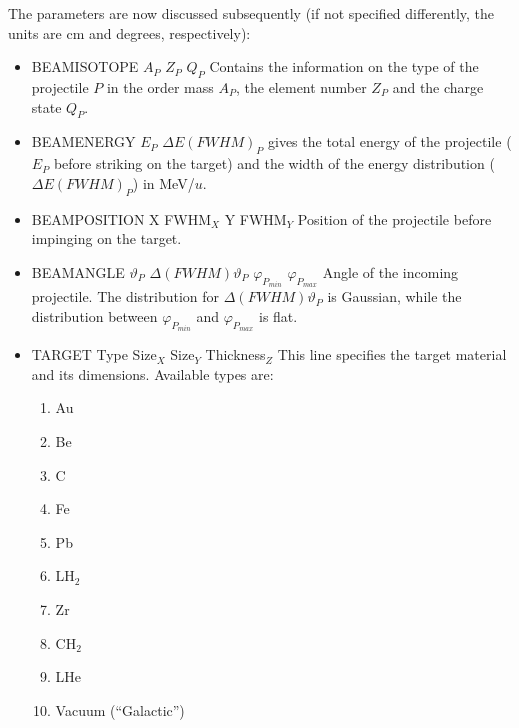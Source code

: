 \documentclass[12pt]{book}
\begin{document}
The parameters are now discussed subsequently (if not specified differently, 
the units are cm and degrees, respectively):\hfill{}
\begin{itemize}
\item BEAMISOTOPE $A_{P}$ $Z_{P}$ $Q_{P}$ \hfill{} \linebreak
  Contains the information on the type of the projectile $P$ in the order 
  mass $A_{P}$, the element number $Z_{P}$ and the charge state $Q_{P}$.
\item BEAMENERGY $E_{P}$ $\Delta E(FWHM)_{P}$\hfill{} \linebreak
  gives the total energy of the projectile 
  ( $E_{P}$ before striking on the target) 
  and the width of the energy distribution ($\Delta E(FWHM)_{P}$) in MeV/$u$.
\item BEAMPOSITION X FWHM$_{X}$ Y FWHM$_{Y}$\hfill{} \linebreak 
  Position of the projectile before impinging on the target. 
\item BEAMANGLE $\vartheta_{P}$ $\Delta (FWHM) \vartheta_{P}$ $\varphi_{P_{min}}$ $\varphi_{P_{max}}$
  \hfill{} \linebreak
  Angle of the incoming projectile. The distribution for $\Delta (FWHM) \vartheta_{P}$ is Gaussian, while the 
  distribution between $\varphi_{P_{min}}$ and $\varphi_{P_{max}}$ is flat.
\item TARGET Type Size$_{X}$ Size$_{Y}$ Thickness$_{Z}$\hfill{} \linebreak 
  This line specifies the target material and its dimensions. Available types are:
  \begin{enumerate}
  	\item Au
  	\item Be
  	\item C
  	\item Fe
  	\item Pb
  	\item LH$_2$
  	\item Zr
  	\item CH$_2$
  	\item LHe
  	\item Vacuum (``Galactic'')
  \end{enumerate}


\end{itemize}
\end{document}

